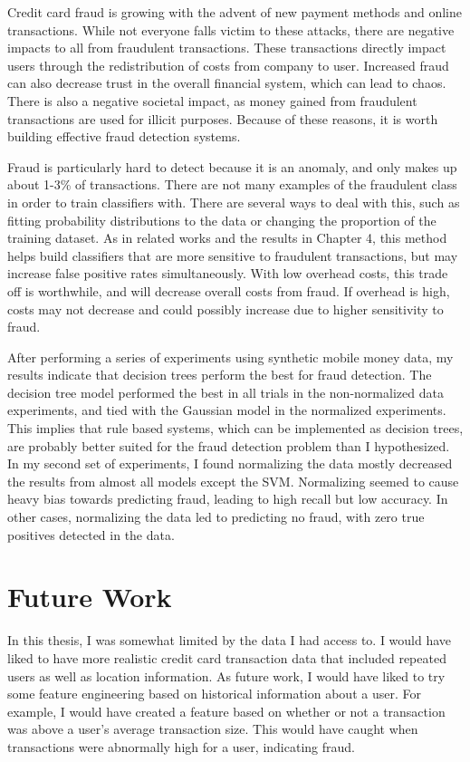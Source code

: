 \documentclass[midd]{thesis}
\begin{document}
Credit card fraud is growing with the advent of new payment methods and online transactions. While not everyone falls victim to these attacks, there are negative impacts to all from fraudulent transactions. These transactions directly impact users through the redistribution of costs from company to user. Increased fraud can also decrease trust in the overall financial system, which can lead to chaos. There is also a negative societal impact, as money gained from fraudulent transactions are used for illicit purposes. Because of these reasons, it is worth building effective fraud detection systems.

Fraud is particularly hard to detect because it is an anomaly, and only makes up about 1-3\% of transactions. There are not many examples of the fraudulent class in order to train classifiers with. There are several ways to deal with this, such as fitting probability distributions to the data or changing the proportion of the training dataset. As in related works and the results in Chapter 4, this method helps build classifiers that are more sensitive to fraudulent transactions, but may increase false positive rates simultaneously.  With low overhead costs, this trade off is worthwhile, and will decrease overall costs from fraud. If overhead is high, costs may not decrease and could possibly increase due to higher sensitivity to fraud. 

After performing a series of experiments using synthetic mobile money data, my results indicate that decision trees perform the best for fraud detection. The decision tree model performed the best in all trials in the non-normalized data experiments, and tied with the Gaussian model in the normalized experiments. This implies that rule based systems, which can be implemented as decision trees, are probably better suited for the fraud detection problem than I hypothesized. In my second set of experiments, I found normalizing the data mostly decreased the results from almost all models except the SVM. Normalizing seemed to cause heavy bias towards predicting fraud, leading to high recall but low accuracy. In other cases, normalizing the data led to predicting no fraud, with zero true positives detected in the data. 

\section{Future Work}

In this thesis, I was somewhat limited by the data I had access to. I would have liked to have more realistic credit card transaction data that included repeated users as well as location information. As future work, I would have liked to try some feature engineering based on historical information about a user. For example, I would have created a feature based on whether or not a transaction was above a user's average transaction size. This would have caught when transactions were abnormally high for a user, indicating fraud. 
\end{document}
